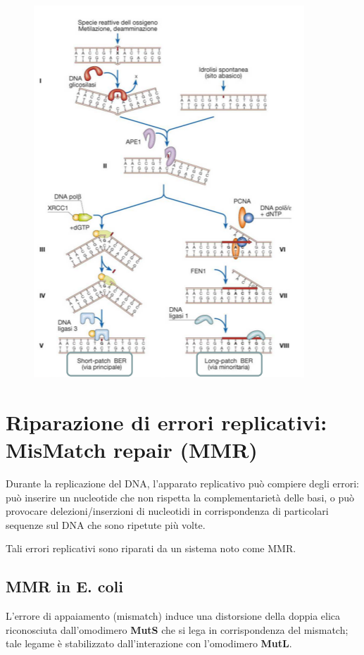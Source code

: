 \documentclass[11pt]{book}
\begin{document}
\begin{figure}[htp]
\centering
\includegraphics[scale=1]{img/25_BER.png}
\caption{}
\label{ber}
\end{figure}

\clearpage

\section{Riparazione di errori replicativi: MisMatch repair
(MMR)}\label{riparazione-di-errori-replicativi-mismatch-repair-mmr}

Durante la replicazione del DNA, l'apparato replicativo può compiere
degli errori: può inserire un nucleotide che non rispetta la
complementarietà delle basi, o può provocare delezioni/inserzioni di
nucleotidi in corrispondenza di particolari sequenze sul DNA che sono
ripetute più volte.

Tali errori replicativi sono riparati da un sistema noto come MMR.

\subsection{MMR in E. coli}\label{mmr-in-e.-coli}

L'errore di appaiamento (mismatch) induce una distorsione della doppia
elica riconosciuta dall'omodimero \textbf{MutS} che si lega in
corrispondenza del mismatch; tale legame è stabilizzato dall'interazione
con l'omodimero \textbf{MutL}.
\end{document}
